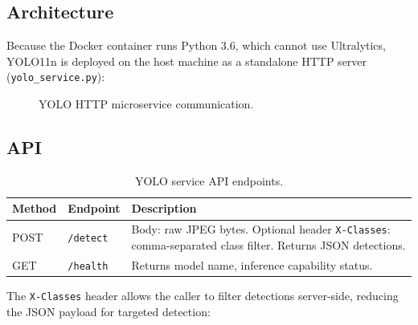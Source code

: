 \subsection{Architecture}

Because the Docker container runs Python 3.6, which cannot use Ultralytics,
YOLO11n is deployed on the host machine as a standalone HTTP server
(\texttt{yolo\_service.py}):

\begin{figure}[H]
\centering
{}
\caption{YOLO HTTP microservice communication.}
\label{fig:yolo_service}
\end{figure}

\subsection{API}

\begin{table}[H]
\centering
\caption{YOLO service API endpoints.}
\label{tab:yolo_api}
\begin{tabularx}{\linewidth}{llX}
\toprule
\textbf{Method} & \textbf{Endpoint} & \textbf{Description} \\
\midrule
POST & \texttt{/detect} & Body: raw JPEG bytes. Optional header \texttt{X-Classes}: comma-separated class filter. Returns JSON detections. \\
GET  & \texttt{/health} & Returns model name, inference capability status. \\
\bottomrule
\end{tabularx}
\end{table}

The \texttt{X-Classes} header allows the caller to filter detections server-side,
reducing the JSON payload for targeted detection:

